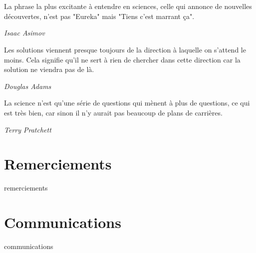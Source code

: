 \documentclass[12pt,twoside]{report}
\begin{document}


\pagestyle{plain}

\clearpage

\chapter*{}
\epigraph{La phrase la plus excitante à entendre en sciences, celle qui annonce de nouvelles découvertes, n'est pas "Eureka" mais "Tiens c'est marrant ça".}{\textit{Isaac Asimov}}
\epigraph{Les solutions viennent presque toujours de la direction à laquelle on s'attend le moins. Cela signifie qu'il ne sert à rien de chercher dans cette direction car la solution ne viendra pas de là.}{\textit{Douglas Adams}}
\epigraph{La science n'est qu'une série de questions qui mènent à plus de questions, ce qui est très bien, car sinon il n'y aurait pas beaucoup de plans de carrières.}{\textit{Terry Pratchett}}



\chapter*{Remerciements}
\label{ch:thx}
{remerciements}

\chapter*{Communications}
\label{ch:com}
{communications}

\cleardoublepage
{}
{}
\hypertarget{mytableofcontents}{}
\tableofcontents
{}
\listoffigures
{}
\listoftables
\hypertarget{abrr}{\printnomenclature}
\end{document}
